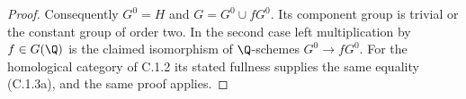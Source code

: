 \begin{proof}
Consequently $G^0=H$ and $G=G^0\cup fG^0$. Its component
group is trivial or the constant group of order two. In the
second case left multiplication by $f\in G(\Q)$ is the
claimed isomorphism of $\Q$-schemes $G^0\to fG^0$.
For the homological category of C.1.2 its stated fullness
supplies the same equality (C.1.3a), and the same proof applies.
\end{proof}
